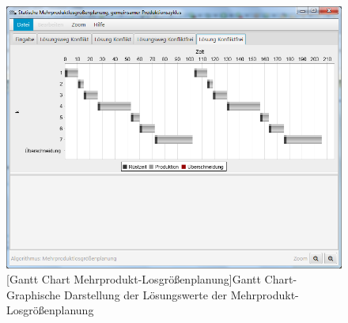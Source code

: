 \begin{figure}[H]
	\centering
	\includegraphics[width=0.8\linewidth]{Bilder/GanttMehrprodukt.png} 
	[Gantt Chart Mehrprodukt-Losgrößenplanung]{Gantt Chart- Graphische Darstellung der Lösungswerte der Mehrprodukt-Losgrößenplanung}
	\label{fig:mehrproduktgantt}
\end{figure}


\pagebreak